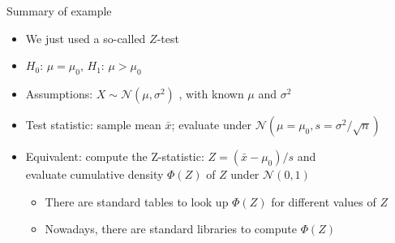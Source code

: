 \begin{frame}[c]{Summary of example}

\begin{itemize}
  \item We just used a so-called \alert{$Z$-test}
  \item $H_0$: $\mu=\mu_0$, $H_1$: $\mu>\mu_0$  
  \item Assumptions: $X \sim \mathcal{N}(\mu,\sigma^2)$ , with known $\mu$ and $\sigma^2$
    
\medskip
\pause
  \item \alert{Test statistic}: sample mean $\bar{x}$; evaluate under 
  $\mathcal{N}(\mu=\mu_0,s=\sigma^2/\sqrt{n})$
  \pause
  \smallskip
  \item Equivalent: compute the \alert{Z-statistic}: $Z = (\bar{x}-\mu_0)/s$
  and\\
  evaluate cumulative density $\Phi(Z)$ of $Z$
  under $\mathcal{N}(0,1)$
\medskip
\pause
  \begin{itemize}
    \item There are standard tables to look up $\Phi(Z)$ for different values of $Z$
    \item Nowadays, there are standard libraries to compute $\Phi(Z)$
  \end{itemize}
    
\end{itemize}

\end{frame}


